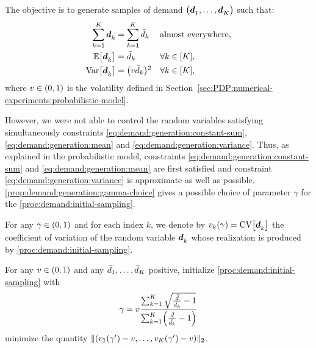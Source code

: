 
The objective is to generate samples of demand $\bracket{\va\demand_1,\ldots,\va\demand_K}$ such that:
\begin{subequations}
  \begin{align}
    \sum_{k=1}^K \va\demand_k &= \sum_{k=1}^K \bar{\demand}_k && \mbox{almost everywhere},
    \label{eq:demand:generation:constant-sum}
    \\
    \espe\sqbracket{\va\demand_k} &= \bar{\demand}_k && \forall k\in\range{K},
    \label{eq:demand:generation:mean}
    \\
    \vari\sqbracket{\va\demand_k} &= \bracket{v\bar{\demand}_k}^2 && \forall k\in\range{K},
    \label{eq:demand:generation:variance}
  \end{align}
\end{subequations}
where $v\in\bracket{0,1}$ is the volatility defined in Section~\cref{sec:PDP:numerical-experiments:probabilistic-model}.


However, we were not able to control the random variables satisfying simultaneously constraints \eqref{eq:demand:generation:constant-sum}, \eqref{eq:demand:generation:mean} and \eqref{eq:demand:generation:variance}.
Thus, as explained in the probabilistic model, constraints \eqref{eq:demand:generation:constant-sum} and \eqref{eq:demand:generation:mean} are first satisfied and constraint \eqref{eq:demand:generation:variance} is approximate as well as possible.
\cref{prop:demand:generation:gamma-choice} gives a possible choice of parameter $\gamma$ for the \cref{proc:demand:initial-sampling}.

For any $\gamma\in\bracket{0,1}$ and for each index $k$, we denote by $v_k\bracket{\gamma}=\CV\sqbracket{\va\demand_k}$ the coefficient of variation of the random variable $\va\demand_k$ whose realization is produced by \cref{proc:demand:initial-sampling}.

\begin{prop}\label{prop:demand:generation:gamma-choice}
For any $v\in\bracket{0,1}$ and any $\bar{d}_1,\ldots,\bar{d}_K$ positive, initialize \cref{proc:demand:initial-sampling} with
\begin{equation}
  \gamma
  =
  v\frac
  {\sum_{k=1}^K\sqrt{\frac{\bar{\demand}}{\bar{\demand_k}}-1}}
  {\sum_{k=1}^K\bracket{\frac{\bar{\demand}}{\bar{\demand_k}}-1}}
\end{equation}
minimize the quantity
$\norm{\bracket{v_1(\gamma')-v,\ldots,v_K(\gamma')-v}}_2$.
\end{prop}


